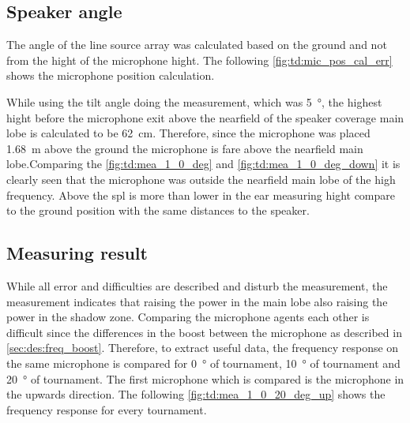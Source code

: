 \subsection{Speaker angle}\label{sec:des:measuring_angle}
The angle of the line source array was calculated based on the ground and not from the hight of the microphone hight. The following \autoref{fig:td:mic_pos_cal_err} shows the microphone position calculation.



While using the tilt angle doing the measurement, which was \SI{5}{\degree}, the highest hight before the microphone exit above the nearfield of the speaker coverage main lobe is calculated to be \SI{62}{\centi\meter}. Therefore, since the microphone was placed \SI{1.68}{\meter} above the ground the microphone is fare above the nearfield main lobe.Comparing the \autoref{fig:td:mea_1_0_deg} and \autoref{fig:td:mea_1_0_deg_down} it is clearly seen that the microphone was outside the nearfield main lobe of the high frequency. Above  the \gls{spl} is more than  lower in the ear measuring hight compare to the ground position with the same distances to the speaker. 

\subsection{Measuring result}\label{sec:des:measuring_result}
While all error and difficulties are described and disturb the measurement, the measurement indicates that raising the power in the main lobe also raising the power in the shadow zone. Comparing the microphone agents each other is difficult since the differences in the boost between the microphone as described in \autoref{sec:des:freq_boost}. Therefore, to extract useful data, the frequency response on the same microphone is compared for \SI{0}{\degree} of tournament, \SI{10}{\degree} of tournament and \SI{20}{\degree} of tournament.   
The first microphone which is compared is the microphone in the upwards direction. The following \autoref{fig:td:mea_1_0_20_deg_up} shows the frequency response for every tournament.


